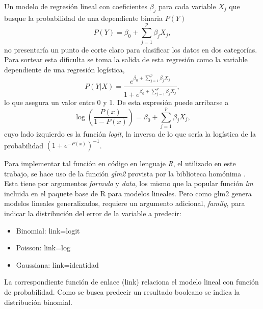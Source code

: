 \documentclass[a4paper]{report}
\begin{document}
Un modelo de regresión lineal con coeficientes \(\beta_j\) para cada variable \(X_j\) que busque la probabilidad de una dependiente binaria \(P(Y)\)  
\begin{equation}
P(Y) = \beta_0 + \sum\limits_{j=1}^p \beta_j X_j,	
\end{equation}
no presentaría un punto de corte claro para clasificar los datos en dos categorías.
Para sortear esta dificulta se toma la salida de esta regresión como la variable dependiente de una regresión logística,
\begin{equation}
P(Y|X)= \frac{e^{\beta_0 + \sum\limits_{j=1}^p \beta_j X_j}}{1+e^{\beta_0 + \sum\limits_{j=1}^p \beta_j X_j}},
\end{equation}
lo que asegura un valor entre 0 y 1.
De esta expresión puede arribarse a 
\begin{equation}
	\log \left( \frac{P(x)}{1-P(x)} \right) = \beta_0 + \sum\limits_{j=1}^p \beta_j X_j,
\end{equation}
cuyo lado izquierdo es la función \emph{logit}, la inversa de lo que sería la logística de la probabilidad \(\left(1 + e^{-{P(x)}}\right)^{-1}\).

Para implementar tal función en código en lenguaje \emph{R}, el utilizado en este trabajo, se hace uso de la función \emph{glm2} provista por la biblioteca homónima \cite{marschner_glm2_2011}.
Esta tiene por argumentos \emph{formula} y \emph{data}, los mismo que la popular función \emph{lm} incluida en el paquete base de R para modelos lineales.
Pero como glm2 genera modelos lineales generalizados, requiere un argumento adicional, \emph{family}, para indicar la distribución del error de la variable a predecir:
\begin{itemize}
	\item Binomial: link=logit
	\item Poisson: link=log
	\item Gaussiana: link=identidad
\end{itemize}
La correspondiente función de enlace (link) relaciona el modelo lineal con función de probabilidad.
Como se busca predecir un resultado booleano se indica la distribución binomial.

\end{document}
